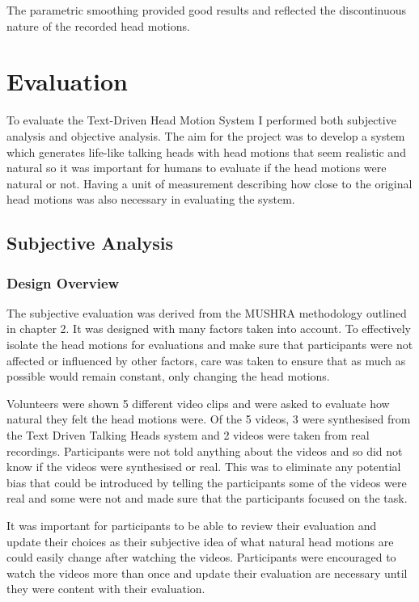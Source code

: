 \documentclass[bsc,frontabs,twoside,singlespacing,parskip]{infthesis}
\begin{document}
The parametric smoothing provided good results and reflected the discontinuous nature of the recorded head motions.

\chapter{Evaluation}

To evaluate the Text-Driven Head Motion System I performed both subjective analysis and objective analysis. The aim for the project was to develop a system which generates life-like talking heads with head motions that seem realistic and natural so it was important for humans to evaluate if the head motions were natural or not. Having a unit of measurement describing how close to the original head motions was also necessary in evaluating the system.

\section{Subjective Analysis}

\subsection{Design Overview}

The subjective evaluation was derived from the MUSHRA methodology outlined in chapter 2. It was designed with many factors taken into account. To effectively isolate the head motions for evaluations and make sure that participants were not affected or influenced by other factors, care was taken to ensure that as much as possible would remain constant, only changing the head motions.

Volunteers were shown 5 different video clips and were asked to evaluate how natural they felt the head motions were. Of the 5 videos, 3 were synthesised from the Text Driven Talking Heads system and 2 videos were taken from real recordings. Participants were not told anything about the videos and so did not know if the videos were synthesised or real. This was to eliminate any potential bias that could be introduced by telling the participants some of the videos were real and some were not and made sure that the participants focused on the task.

It was important for participants to be able to review their evaluation and update their choices as their subjective idea of what natural head motions are could easily change after watching the videos. Participants were encouraged to watch the videos more than once and update their evaluation are necessary until they were content with their evaluation.
\end{document}
